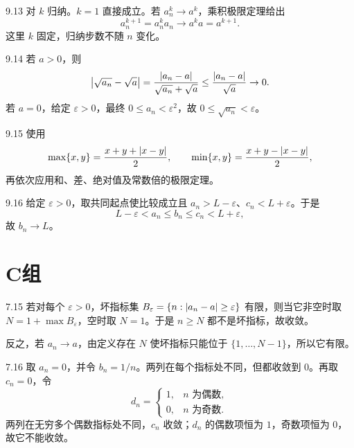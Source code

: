 \begin{solution}{9.13}
对 \(k\) 归纳。\(k=1\) 直接成立。若 \(a_n^k\to a^k\)，乘积极限定理给出
\[
 a_n^{k+1}=a_n^ka_n\longrightarrow a^ka=a^{k+1}.
\]
这里 \(k\) 固定，归纳步数不随 \(n\) 变化。
\end{solution}

\begin{solution}{9.14}
若 \(a>0\)，则
\[
 \left|\sqrt{a_n}-\sqrt a\right|
 =\frac{\left|a_n-a\right|}{\sqrt{a_n}+\sqrt a}
 \le\frac{\left|a_n-a\right|}{\sqrt a}\to0.
\]
若 \(a=0\)，给定 \(\varepsilon>0\)，最终 \(0\le a_n<\varepsilon^2\)，故
\(0\le\sqrt{a_n}<\varepsilon\)。
\end{solution}

\begin{solution}{9.15}
使用
\[
 \max\{x,y\}=\frac{x+y+\left|x-y\right|}2,\qquad
 \min\{x,y\}=\frac{x+y-\left|x-y\right|}2,
\]
再依次应用和、差、绝对值及常数倍的极限定理。
\end{solution}

\begin{solution}{9.16}
给定 \(\varepsilon>0\)，取共同起点使比较成立且
\(a_n>L-\varepsilon\)、\(c_n<L+\varepsilon\)。于是
\[
 L-\varepsilon<a_n\le b_n\le c_n<L+\varepsilon,
\]
故 \(b_n\to L\)。
\end{solution}

\section*{C组}

\begin{solution}{7.15}
若对每个 \(\varepsilon>0\)，坏指标集
\(B_\varepsilon=\{n:\left|a_n-a\right|\ge\varepsilon\}\) 有限，则当它非空时取
\(N=1+\max B_\varepsilon\)，空时取 \(N=1\)。于是 \(n\ge N\) 都不是坏指标，故收敛。

反之，若 \(a_n\to a\)，由定义存在 \(N\) 使坏指标只能位于
\(\{1,\ldots,N-1\}\)，所以它有限。
\end{solution}

\begin{solution}{7.16}
取 \(a_n=0\)，并令 \(b_n=1/n\)。两列在每个指标处不同，但都收敛到 \(0\)。再取 \(c_n=0\)，令
\[
 d_n=\begin{cases}1,&n\text{ 为偶数},\\0,&n\text{ 为奇数}.
 \end{cases}
\]
两列在无穷多个偶数指标处不同，\(c_n\) 收敛；\(d_n\) 的偶数项恒为 \(1\)，奇数项恒为 \(0\)，故它不能收敛。
\end{solution}

